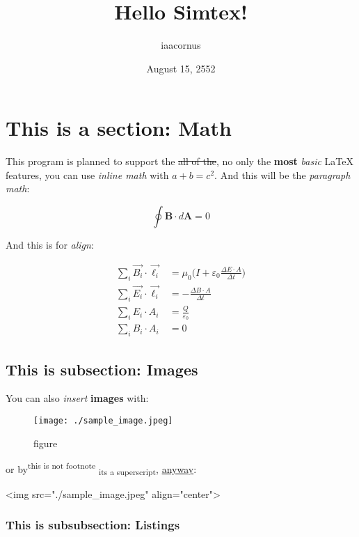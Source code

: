 \documentclass[12pt, UTF8]{article}
\title{Hello Simtex!}
\author{iaacornus}
\date{August 15, 2552}
\begin{document}
	\maketitle
	
	\section{This is a section: Math}
	
	This program is planned to support the \sout{all of the}, no only the \textbf{most} \textit{basic} \LaTeX{} features, you can use \emph{inline math} with $a + b = c^2$. And this will be the \emph{paragraph math}:
	
	\begin{equation}
		\oint \boldsymbol{B} \cdot d \boldsymbol{A} = 0
	\end{equation}
	
	And this is for \emph{align}:
	
	\begin{align}
		\sum_{i} \vec{B_{i}} \cdot \vec{\ell_{i}} &= \mu_{0} \bigg(I + \varepsilon_{0} \frac{\Delta E \cdot A}{\Delta t} \bigg)\\
		\sum_{i} \vec{E_{i}} \cdot \vec{\ell_{i}} &= - \frac{\Delta B \cdot A}{\Delta t}\\
		\sum_{i} E_{i} \cdot A_{i} &= \frac{Q}{\varepsilon_{0}}\\
		\sum_{i} B_{i} \cdot A_{i} &= 0
	\end{align}
	
	\subsection{This is subsection: Images}
	
	You can also \textit{insert} \textbf{images} with:
	
	\begin{figure}[h]
		\texttt{[image: ./sample\_image.jpeg]}
		\caption{figure}
	\end{figure}
	
	or by\textsuperscript{this is not footnote} \textsubscript{its a superscript}, \underline{anyway}:
	
	
	<img src="./sample\_image.jpeg" align="center">
	
	
	\subsubsection{This is subsubsection: Listings}
	
\end{document}
